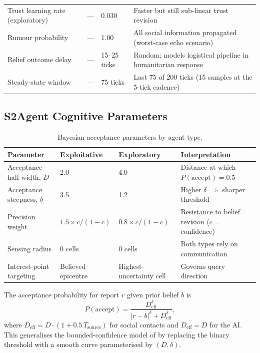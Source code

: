\begin{table}[h]
\begin{tabular}{llll}
Trust learning rate (exploratory)  & --- & 0.030   & Faster but still sub-linear trust revision \\
Rumour probability          & ---  & 1.00           & All social information propagated (worst-case echo scenario) \\
Relief outcome delay        & ---  & 15--25 ticks   & Random; models logistical pipeline in humanitarian response \\
Steady-state window         & ---  & 75 ticks       & Last 75 of 200 ticks (15 samples at the 5-tick cadence) \\
\bottomrule
\end{tabular}
\end{table}

\subsection*{S2\quad Agent Cognitive Parameters}

\begin{table}[h]
\centering
\caption{Bayesian acceptance parameters by agent type.}
\label{tab:S2}
\small
\begin{tabular}{llll}
\toprule
Parameter & Exploitative & Exploratory & Interpretation \\
\midrule
Acceptance half-width, $D$   & 2.0 & 4.0 & Distance at which $P(\text{accept})=0.5$ \\
Acceptance steepness, $\delta$ & 3.5 & 1.2 & Higher $\delta$ $\Rightarrow$ sharper threshold \\
Precision weight             & $1.5\times c/(1-c)$ & $0.8\times c/(1-c)$ & Resistance to belief revision ($c$ = confidence) \\
Sensing radius               & 0 cells & 0 cells & Both types rely on communication \\
Interest-point targeting     & Believed epicentre & Highest-uncertainty cell & Governs query direction \\
\bottomrule
\end{tabular}
\end{table}

The acceptance probability for report $r$ given prior belief $b$ is
%
\begin{equation}
  P(\text{accept}) = \frac{D_{\mathrm{eff}}^{\delta}}{|r-b|^{\delta}+D_{\mathrm{eff}}^{\delta}},
  \tag{S1}
\end{equation}
%
where $D_{\mathrm{eff}} = D\cdot(1+0.5\,T_{\mathrm{source}})$ for social
contacts and $D_{\mathrm{eff}}=D$ for the AI.
This generalises the bounded-confidence model of \citet{Deffuant2000} by
replacing the binary threshold with a smooth curve parameterised by $(D,\delta)$.

